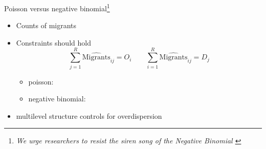 \documentclass{beamer}
\begin{document}
\begin{frame}{Poisson versus negative binomial\footnote{
			\emph{We urge researchers to resist the siren song of the Negative
			Binomial \footnotesize{ \citep{head2014gravity}} }
			}}
	
	\begin{itemize}
		\item \alert{Counts} of migrants\newline 
		\item \alert{Constraints} should hold
		$$
		\sum_{j=1}^{R} {\widehat{\text{Migrants} }_{ij} } = O_i \qquad \sum_{i=1}^{R} {\widehat{\text{Migrants} }_{ij} } = D_j
		$$
		\begin{itemize}
			\item poisson: 
		    \item negative binomial:  \newline
		  \end{itemize}
		  \item multilevel structure  \alert{controls} for overdispersion
		\end{itemize}

\end{frame}
\end{document}
